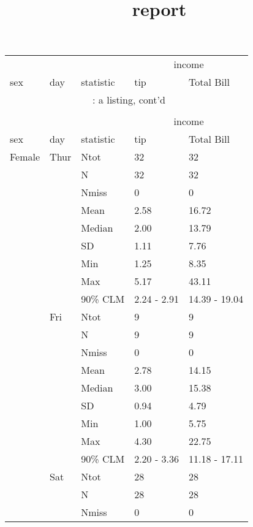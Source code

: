 \documentclass[8pt]{beamer}
\begin{document}
\title[{\makebox[.95\paperwidth]{\hfill\insertframenumber/\inserttotalframenumber}}]{ report \\}
\begin{frame}\titlepage
\end{frame}
\begin{frame}
\hypertarget{a listing}{} 
\footnotesize\begin{longtable}{p{3cm}llll}
\toprule
\multicolumn{3}{c}{}&\multicolumn{2}{c}{income} \\
\cmidrule(lr){4-5}
sex & day & statistic & tip & Total Bill\\
\hline
\endfirsthead
\multicolumn{5}{c}{\tablename~\thetable{}: a listing, cont'd}\\\\
\toprule
\multicolumn{3}{c}{}&\multicolumn{2}{c}{income} \\
\cmidrule(lr){4-5}
sex & day & statistic & tip & Total Bill\\
\hline
\endhead
Female & Thur & Ntot & 32 & 32 \\
 &  & N & 32 & 32 \\
 &  & Nmiss & 0 & 0 \\
 &  & Mean & 2.58 & 16.72 \\
 &  & Median & 2.00 & 13.79 \\
 &  & SD & 1.11 & 7.76 \\
 &  & Min & 1.25 & 8.35 \\
 &  & Max & 5.17 & 43.11 \\
 &  & 90\% CLM & 2.24 - 2.91 & 14.39 - 19.04 \\
[2ex]
 & Fri & Ntot & 9 & 9 \\
 &  & N & 9 & 9 \\
 &  & Nmiss & 0 & 0 \\
 &  & Mean & 2.78 & 14.15 \\
 &  & Median & 3.00 & 15.38 \\
 &  & SD & 0.94 & 4.79 \\
 &  & Min & 1.00 & 5.75 \\
 &  & Max & 4.30 & 22.75 \\
 &  & 90\% CLM & 2.20 - 3.36 & 11.18 - 17.11 \\
[2ex]
 & Sat & Ntot & 28 & 28 \\
 &  & N & 28 & 28 \\
 &  & Nmiss & 0 & 0 \\

\end{longtable}
\end{frame}
\end{document}
